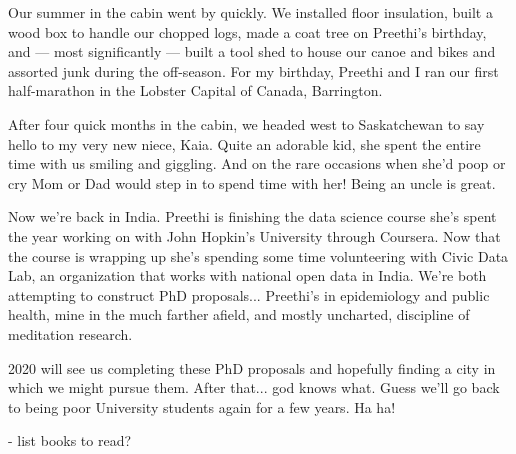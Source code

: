 \documentclass{article}
\begin{document}
Our summer in the cabin went by quickly. We installed floor insulation, built a wood
box to handle our chopped logs, made a coat tree on Preethi's birthday, and --- most
significantly --- built a tool shed to house our canoe and bikes and assorted junk
during the off-season. For my birthday, Preethi and I ran our first half-marathon in
the Lobster Capital of Canada, Barrington.

After four quick months in the cabin, we headed west to Saskatchewan to say hello to
my very new niece, Kaia. Quite an adorable kid, she spent the entire time with us
smiling and giggling. And on the rare occasions when she'd poop or cry Mom or Dad
would step in to spend time with her! Being an uncle is great.

Now we're back in India. Preethi is finishing the data science course she's spent the
year working on with John Hopkin's University through Coursera. Now that the course
is wrapping up she's spending some time volunteering with Civic Data Lab, an
organization that works with national open data in India. We're both attempting to
construct PhD proposals... Preethi's in epidemiology and public health, mine in the
much farther afield, and mostly uncharted, discipline of meditation research.

2020 will see us completing these PhD proposals and hopefully finding a city in which
we might pursue them. After that... god knows what. Guess we'll go back to being poor
University students again for a few years. Ha ha!

- list books to read?
\end{document}
